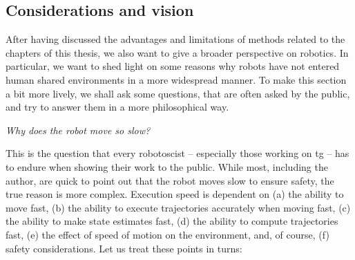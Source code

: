 \subsection{Considerations and vision}
\label{sec:discussion_vision}

After having discussed the advantages and limitations of
methods related to the chapters of this thesis, we also want
to give a broader perspective on robotics. In particular, we
want to shed light on some reasons why robots have not
entered human shared environments in a more widespread
manner. To make this section a bit more lively, we shall ask
some questions, that are often asked by the public, and
try to answer them in a more philosophical way.


\textit{Why does the robot move so slow?}

This is the question that every robotoscist
-- especially those working on \ac{tg} --
has to endure when showing their work to the public. While most, including the
author, are quick to point out that the robot moves slow to ensure safety, the
true reason is more complex. Execution speed is dependent on
(a) the ability to move fast,
(b) the ability to execute trajectories accurately when moving fast,
(c) the ability to make state estimates fast,
(d) the ability to compute trajectories fast,
(e) the effect of speed of motion on the environment,
and, of course,  (f) safety considerations.
Let us treat these
points in turns:
